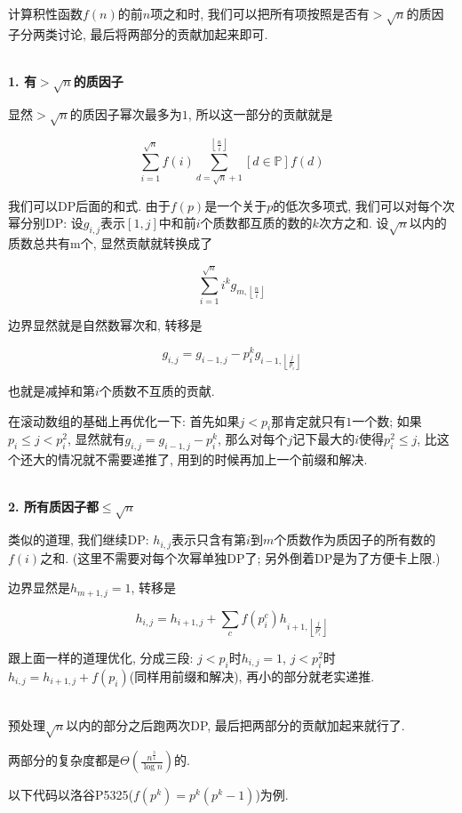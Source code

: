计算积性函数$f(n)$的前$n$项之和时, 我们可以把所有项按照是否有$> \sqrt n$的质因子分两类讨论, 最后将两部分的贡献加起来即可.

~\\

\textbf{1. 有$> \sqrt n$的质因子}

显然$> \sqrt n$的质因子幂次最多为$1$, 所以这一部分的贡献就是

$$ \sum_{i = 1} ^ {\sqrt n} f(i) \sum_{d = \sqrt n + 1} ^ {\left\lfloor \frac n i \right\rfloor} \left[ d \in \mathbb{P} \right] f(d) $$

我们可以DP后面的和式. 由于$f(p)$是一个关于$p$的低次多项式, 我们可以对每个次幂分别DP: 设$g_{i, j}$表示$[1, j]$中和前$i$个质数都互质的数的$k$次方之和. 设$\sqrt n$以内的质数总共有m个, 显然贡献就转换成了

$$ \sum_{i = 1} ^ {\sqrt n} i ^ k g_{m, \left\lfloor \frac n i \right\rfloor} $$

边界显然就是自然数幂次和, 转移是

$$ g_{i, j} = g_{i - 1, j} - p_i ^ k g_{i - 1, \left\lfloor \frac j {p_i} \right\rfloor} $$

也就是减掉和第$i$个质数不互质的贡献.

在滚动数组的基础上再优化一下: 首先如果$j < p_i$那肯定就只有$1$一个数; 如果$p_i \le j < p_i ^ 2$, 显然就有$g_{i, j} = g_{i - 1, j} - p_i ^ k$, 那么对每个$j$记下最大的$i$使得$p_i ^ 2 \le j$, 比这个还大的情况就不需要递推了, 用到的时候再加上一个前缀和解决.

~\\

\textbf{2. 所有质因子都$\le \sqrt n$}

类似的道理, 我们继续DP: $h_{i, j}$表示只含有第$i$到$m$个质数作为质因子的所有数的$f(i)$之和. (这里不需要对每个次幂单独DP了; 另外倒着DP是为了方便卡上限.)

边界显然是$h_{m + 1, j} = 1$, 转移是

$$ h_{i, j} = h_{i + 1, j} + \sum_{c} f(p_i ^ c) h_{i + 1, \left\lfloor \frac j {p_i ^ c} \right\rfloor} $$

跟上面一样的道理优化, 分成三段: $j < p_i$时$h_{i, j} = 1$, $j < p_i ^ 2$时$h_{i, j} = h_{i + 1, j} + f(p_i)$(同样用前缀和解决), 再小的部分就老实递推.

~\\

预处理$\sqrt n$以内的部分之后跑两次DP, 最后把两部分的贡献加起来就行了.

两部分的复杂度都是$\Theta \left( \frac {n ^ {\frac 3 4}} {\log n} \right)$的.

以下代码以洛谷P5325($f(p^k) = p^k (p^k - 1)$)为例.

\inputminted{cpp}{../src/numbertheory/洲阁筛.cpp}